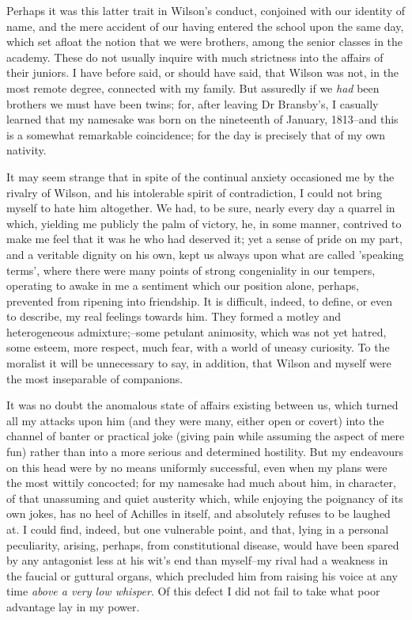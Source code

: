 \documentclass[12pt]{book}
\begin{document}
     Perhaps it was this latter trait in Wilson's conduct,
conjoined with our identity of name, and the mere accident of our
having entered the school upon the same day, which set afloat the
notion that we were brothers, among the senior classes in the
academy.  These do not usually inquire with much strictness into
the affairs of their juniors.  I have before said, or should have
said, that Wilson was not, in the most remote degree, connected
with my family.  But assuredly if we \emph{had} been brothers we must
have been twins; for, after leaving Dr Bransby's, I casually
learned that my namesake was born on the nineteenth of January,
1813--and this is a somewhat remarkable coincidence; for the day is
precisely that of my own nativity.

     It may seem strange that in spite of the continual anxiety
occasioned me by the rivalry of Wilson, and his intolerable spirit
of contradiction, I could not bring myself to hate him altogether. 
We had, to be sure, nearly every day a quarrel in which, yielding
me publicly the palm of victory, he, in some manner, contrived to
make me feel that it was he who had deserved it; yet a sense of
pride on my part, and a veritable dignity on his own, kept us
always upon what are called 'speaking terms', where there were 
 many points of strong congeniality in our tempers, operating to
awake in me a sentiment which our position alone, perhaps,
prevented from ripening into friendship.  It is difficult, indeed,
to define, or even to describe, my real feelings towards him.  They
formed a motley and heterogeneous admixture;--some petulant
animosity, which was not yet hatred, some esteem, more respect,
much fear, with a world of uneasy curiosity.  To the moralist it
will be unnecessary to say, in addition, that Wilson and myself
were the most inseparable of companions.

     It was no doubt the anomalous state of affairs existing
between us, which turned all my attacks upon him (and they were
many, either open or covert) into the channel of banter or
practical joke (giving pain while assuming the aspect of mere fun)
rather than into a more serious and determined hostility.  But my
endeavours on this head were by no means uniformly successful, even
when my plans were the most wittily concocted; for my namesake had
much about him, in character, of that unassuming and quiet
austerity which, while enjoying the poignancy of its own jokes, has
no heel of Achilles in itself, and absolutely refuses to be laughed
at.  I could find, indeed, but one vulnerable point, and that,
lying in a personal peculiarity, arising, perhaps, from
constitutional disease, would have been spared by any antagonist
less at his wit's end than myself--my rival had a weakness in the
faucial or guttural organs, which precluded him from raising his
voice at any time \emph{above a very low whisper}.  Of this defect I
did not fail to take what poor advantage lay in my power.
\end{document}
